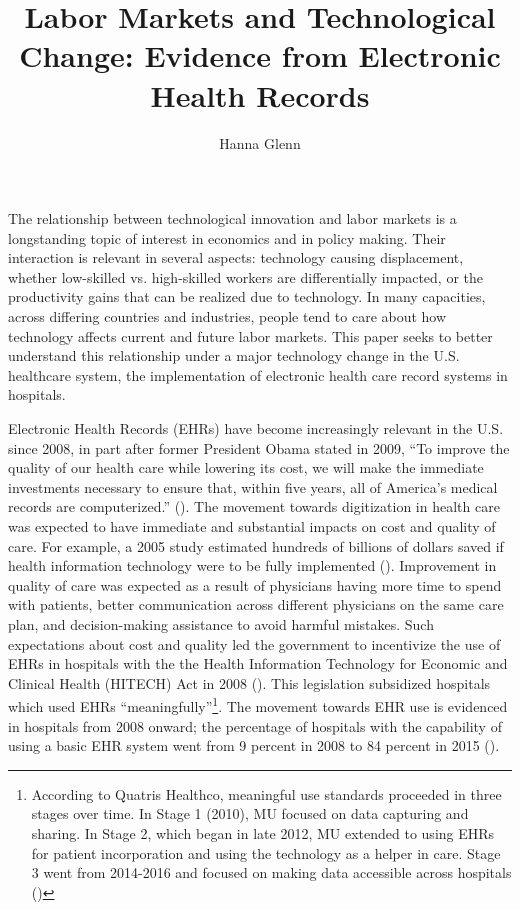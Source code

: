 \documentclass[11pt]{article}
\title{Labor Markets and Technological Change: Evidence from Electronic Health Records}
\author{Hanna Glenn}
\begin{document}
\maketitle



\vspace{1.5cm}

The relationship between technological innovation and labor markets is a longstanding topic of interest in economics and in policy making. Their interaction is relevant in several aspects: technology causing displacement, whether low-skilled vs. high-skilled workers are differentially impacted, or the productivity gains that can be realized due to technology. In many capacities, across differing countries and industries, people tend to care about how technology affects current and future labor markets. This paper seeks to better understand this relationship under a major technology change in the U.S. healthcare system, the implementation of electronic health care record systems in hospitals. 

Electronic Health Records (EHRs) have become increasingly relevant in the U.S. since 2008, in part after former President Obama stated in 2009, “To improve the quality of our health care while lowering its cost, we will make the immediate investments necessary to ensure that, within five years, all of America’s medical records are computerized.” (\cite{presquote}). The movement towards digitization in health care was expected to have immediate and substantial impacts on cost and quality of care. For example, a 2005 study estimated hundreds of billions of dollars saved if health information technology were to be fully implemented (\cite{hillestad2005}). Improvement in quality of care was expected as a result of physicians having more time to spend with patients, better communication across different physicians on the same care plan, and decision-making assistance to avoid harmful mistakes. Such expectations about cost and quality led the government to incentivize the use of EHRs in hospitals with the the Health Information Technology for Economic and Clinical Health (HITECH) Act in 2008 (\cite{hitech}). This legislation subsidized hospitals which used EHRs “meaningfully”\footnote{According to Quatris Healthco, meaningful use standards proceeded in three stages over time. In Stage 1 (2010), MU focused on data capturing and sharing. In Stage 2, which began in late 2012, MU extended to using EHRs for patient incorporation and using the technology as a helper in care. Stage 3 went from 2014-2016 and focused on making data accessible across hospitals (\cite{meanuse})}. The movement towards EHR use is evidenced in hospitals from 2008 onward; the percentage of hospitals with the capability of using a basic EHR system went from 9 percent in 2008 to 84 percent in 2015 (\cite{stats}).
\end{document}
